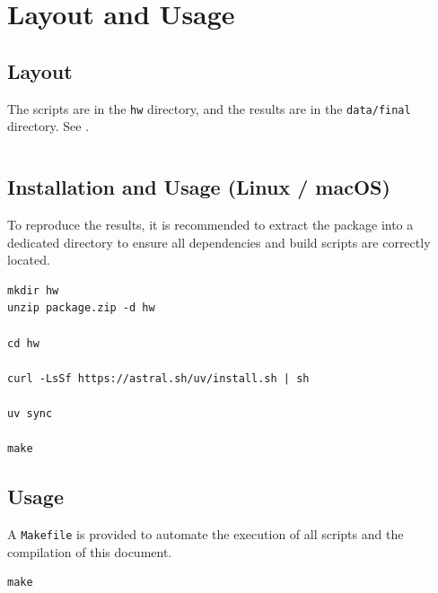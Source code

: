 \section{Layout and Usage}

\subsection{Layout}

The scripts are in the \texttt{hw} directory, and the results are in the \texttt{data/final} directory. See .

\begin{longlisting}
    \caption{Tree}
    \label{lst:tree}
    \inputminted{text}{data/tree.txt}
\end{longlisting}

\subsection{Installation and Usage (Linux / macOS)}

To reproduce the results, it is recommended to extract the package into a dedicated directory to ensure all dependencies and build scripts are correctly located.

\begin{verbatim}
mkdir hw
unzip package.zip -d hw

cd hw

curl -LsSf https://astral.sh/uv/install.sh | sh

uv sync

make
\end{verbatim}

\subsection{Usage}

A \texttt{Makefile} is provided to automate the execution of all scripts and the compilation of this document.

\begin{verbatim}
make
\end{verbatim}
